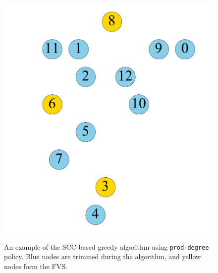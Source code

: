 \begin{figure}[t]
\begin{minipage}[b]{0.19\linewidth}
	\end{minipage}                  
	\begin{minipage}[b]{0.19\linewidth}
		\centering
		{\includegraphics[width=\textwidth]{./alg_fig/scc-g7}}
	\end{minipage}  
	\caption{An example of the SCC-based greedy algorithm using \texttt{prod-degree} policy. Blue nodes are trimmed during the algorithm, and yellow nodes form the FVS.}
	\label{fig:scc}
\end{figure}

